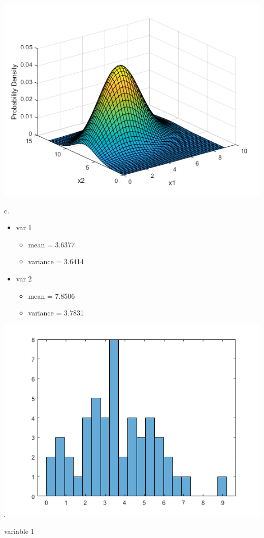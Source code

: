 \documentclass[a4paper]{article}
\begin{document}
\begin{center}
    \includegraphics[scale=1]{1b.png}
\end{center}

\noindent
c. 
\begin{itemize}
    \item var 1
    \begin{itemize}
        \item mean = 3.6377
        \item variance = 3.6414
    \end{itemize}
    \item var 2
    \begin{itemize}
        \item mean = 7.8506
        \item variance = 3.7831
    \end{itemize}
\end{itemize}


\begin{center}
    \includegraphics[scale=1]{1c-1.png}
    \caption{variable 1}
\end{center}
\end{document}
